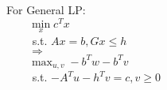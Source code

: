 \documentclass[10pt]{article}
\begin{document}
For General LP: \\
$\qquad \min\limits_{x}c^{T}x $ \\
$\qquad$ s.t. $Ax = b, Gx \le h$ \\
$ \qquad \Rightarrow$ \\
$\qquad \max_{u,v} -b^{T}w -b^{T}v $ \\
$\qquad$ s.t. $-A^{T}u - h^{T}v = c, v\ge 0$



%
%
\end{document}
